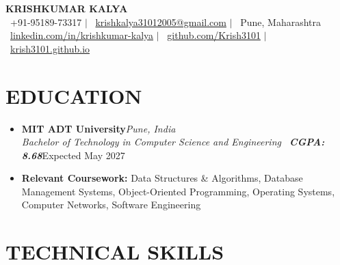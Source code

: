 \documentclass[11pt,a4paper]{article}
\newcommand{\resumeSubheading}[4]{%
    \item[]
    \noindent
    \textbf{#1}\hfill\textit{#2}\\
    \textit{\small #3}\hfill\small #4
    \par\vspace{0.8pt}
}
\begin{document}

\begin{center}

{\LARGE\bfseries\color{darkblue} KRISHKUMAR KALYA}\\[2.5pt]

\small
\faPhone\ +91-95189-73317
\quad $|$ \quad
\faEnvelope\ \href{mailto:krishkalya31012005@gmail.com}{krishkalya31012005@gmail.com}
\quad $|$ \quad
\faMapMarker\ Pune, Maharashtra
\\[1.5pt]

\faLinkedin\ \href{https://www.linkedin.com/in/krishkumar-kalya-b05b941b3/}{linkedin.com/in/krishkumar-kalya}
\quad $|$ \quad
\faGithub\ \href{https://github.com/Krish3101}{github.com/Krish3101}
\quad $|$ \quad
\faGlobe\ \href{https://krish3101.github.io}{krish3101.github.io}

\end{center}

\vspace{-4pt}


\section{EDUCATION}

\begin{itemize}[leftmargin=0pt]

\resumeSubheading
{MIT ADT University}
{Pune, India}
{Bachelor of Technology in Computer Science and Engineering \textbar\ \textbf{CGPA: 8.68}}
{Expected May 2027}

\vspace{2pt}
\item[]\small{\textbf{Relevant Coursework:} Data Structures \& Algorithms, Database Management Systems, Object-Oriented Programming, Operating Systems, Computer Networks, Software Engineering}

\end{itemize}


\section{TECHNICAL SKILLS}
\end{document}
